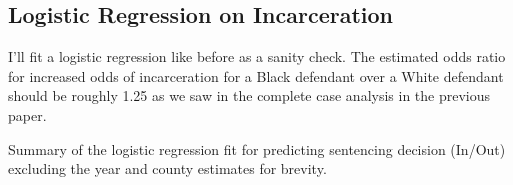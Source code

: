 \documentclass[
  letterpaper,
  DIV=11,
  numbers=noendperiod]{scrartcl}
\begin{document}
\hypertarget{logistic-regression-on-incarceration}{%
\subsection{Logistic Regression on
Incarceration}\label{logistic-regression-on-incarceration}}

I'll fit a logistic regression like before as a sanity check. The
estimated odds ratio for increased odds of incarceration for a Black
defendant over a White defendant should be roughly 1.25 as we saw in the
complete case analysis in the previous paper.

\hypertarget{tbl-glm-summary}{}
\begin{table}
\caption{\label{tbl-glm-summary}Summary of the logistic regression fit for predicting sentencing
decision (In/Out) excluding the year and county estimates for brevity. }\tabularnewline


\end{table}
\end{document}
